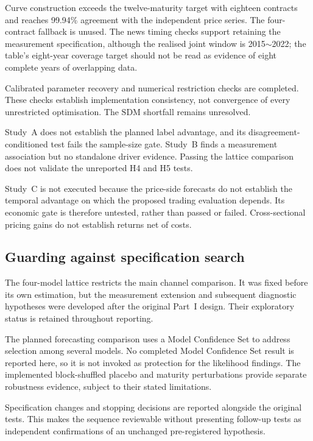 \documentclass[journal]{IEEEtran}
\newcommand{\rng}{\ensuremath{\sim}}
\begin{document}
Curve construction exceeds the twelve-maturity target with eighteen contracts and reaches 99.94\% agreement with the independent price series. The four-contract fallback is unused. The news timing checks support retaining the measurement specification, although the realised joint window is 2015\rng{}2022; the table's eight-year coverage target should not be read as evidence of eight complete years of overlapping data.

Calibrated parameter recovery and numerical restriction checks are completed. These checks establish implementation consistency, not convergence of every unrestricted optimisation. The $\mathrm{SDM}$ shortfall remains unresolved.

Study~A does not establish the planned label advantage, and its disagreement-conditioned test fails the sample-size gate. Study~B finds a measurement association but no standalone driver evidence. Passing the lattice comparison does not validate the unreported H4 and H5 tests.

Study~C is not executed because the price-side forecasts do not establish the temporal advantage on which the proposed trading evaluation depends. Its economic gate is therefore untested, rather than passed or failed. Cross-sectional pricing gains do not establish returns net of costs.

\subsection{Guarding against specification search}
\label{sec:specsearch}

The four-model lattice restricts the main channel comparison. It was fixed before its own estimation, but the measurement extension and subsequent diagnostic hypotheses were developed after the original Part~I design. Their exploratory status is retained throughout reporting.

The planned forecasting comparison uses a Model Confidence Set to address selection among several models. No completed Model Confidence Set result is reported here, so it is not invoked as protection for the likelihood findings. The implemented block-shuffled placebo and maturity perturbations provide separate robustness evidence, subject to their stated limitations.

Specification changes and stopping decisions are reported alongside the original tests. This makes the sequence reviewable without presenting follow-up tests as independent confirmations of an unchanged pre-registered hypothesis.
\end{document}
